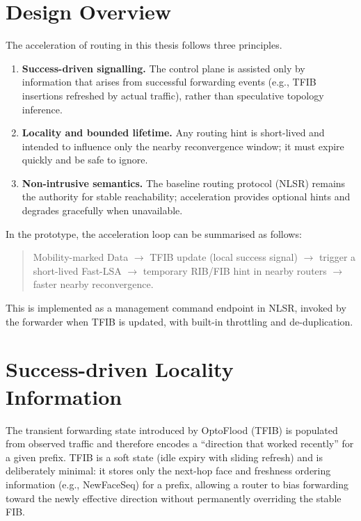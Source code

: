 
\section{Design Overview}
\label{sec:routing_acceleration:design_overview}

The acceleration of routing in this thesis follows three principles.

\begin{enumerate}
  \item \textbf{Success-driven signalling.} The control plane is assisted only by information that arises from successful forwarding events (e.g., TFIB insertions refreshed by actual traffic), rather than speculative topology inference.
  \item \textbf{Locality and bounded lifetime.} Any routing hint is short-lived and intended to influence only the nearby reconvergence window; it must expire quickly and be safe to ignore.
  \item \textbf{Non-intrusive semantics.} The baseline routing protocol (NLSR) remains the authority for stable reachability; acceleration provides optional hints and degrades gracefully when unavailable.
\end{enumerate}

In the prototype, the acceleration loop can be summarised as follows:

\begin{quote}
Mobility-marked Data $\rightarrow$ TFIB update (local success signal) $\rightarrow$ trigger a short-lived Fast-LSA $\rightarrow$ temporary RIB/FIB hint in nearby routers $\rightarrow$ faster nearby reconvergence.
\end{quote}

This is implemented as a management command endpoint in NLSR, invoked by the forwarder
when TFIB is updated, with built-in throttling and de-duplication.


\section{Success-driven Locality Information}
\label{sec:routing_acc:success-driven_locality_information}

The transient forwarding state introduced by OptoFlood (TFIB) is populated from observed traffic and therefore encodes a “direction that worked recently” for a given prefix. TFIB is a soft state (idle expiry with sliding refresh) and is deliberately minimal: it stores only the next-hop face and freshness ordering information (e.g., NewFaceSeq) for a prefix, allowing a router to bias forwarding toward the newly effective direction without permanently overriding the stable FIB.

